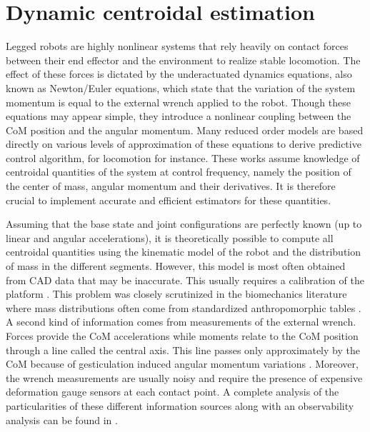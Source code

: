 \section{Dynamic centroidal estimation}
%
Legged robots are highly nonlinear systems that rely heavily on contact forces between their end effector and the environment to realize stable locomotion. 
The effect of these forces is dictated by the underactuated dynamics equations, also known as Newton/Euler equations, which state that the variation of the 
system momentum is equal to the external wrench applied to the robot. Though these equations may appear simple, they introduce a nonlinear coupling 
between the CoM position and the angular momentum. Many reduced order models are based directly on 
various levels of approximation of these equations \cite{kajita20013d, wieber2006trajectory, carpentier2016versatile} to derive predictive
control algorithm, for locomotion for instance. These works assume knowledge of centroidal quantities of the system at control frequency, 
namely the position of the center of mass, angular momentum and their derivatives. 
It is therefore crucial to implement accurate and efficient estimators for these quantities.

Assuming that the base state and joint configurations are perfectly known (up to linear and angular accelerations), it is theoretically possible 
to compute all centroidal quantities using the kinematic model of the robot and the distribution of mass in the different segments. 
However, this model is most often obtained from CAD data that may be inaccurate. This usually requires a calibration of
the platform \cite{ayusawa2008identification, ayusawa2014identifiability, bonnet2018inertial, bonnet2019overview}. 
This problem was closely scrutinized in the biomechanics literature where mass distributions often come from standardized anthropomorphic tables \cite{de1996adjustments}. 
A second kind of information comes from measurements of the external wrench. 
Forces provide the CoM accelerations while moments relate to the CoM position through a line called the central axis. This line passes only approximately by
the CoM because of gesticulation induced angular momentum variations \cite{wieber2006holonomy}. Moreover, the wrench measurements are usually noisy
and require the presence of expensive deformation gauge sensors at each contact point. A complete analysis of the particularities
of these different information sources along with an observability analysis can be found in \cite{carpentier2016center}.

